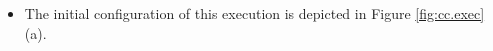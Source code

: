 \begin{itemize}
\item 
The initial configuration of this execution is depicted in Figure \ref{fig:cc.exec}(a).
%
%
%
%
%
%
% 
%
% 

\end{itemize}
